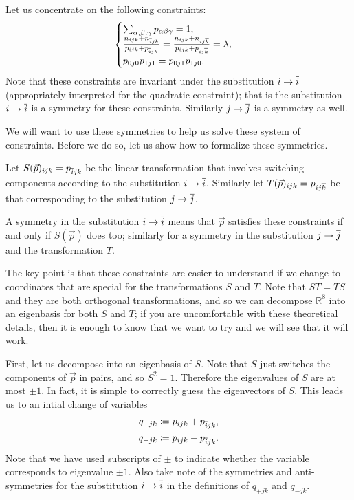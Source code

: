 Let us concentrate on the following constraints:
\begin{equation}
\begin{cases}
\sum_{\alpha, \beta, \gamma} p_{\alpha\beta\gamma} = 1, \\
\frac{n_{ijk} + n_{\overline{i}jk}} {p_{ijk} + p_{\overline{i}jk}} = 
    \frac{n_{ijk} + n_{ij\overline{k}}} {p_{ijk} + p_{ij\overline{k}}} =
    \lambda, \\
p_{0j0}p_{1j1} = p_{0j1}p_{1j0}.
\end{cases}
\end{equation}
Note that these constraints are invariant under the substitution \(i \to \overline{i}\) (appropriately interpreted
for the quadratic constraint); that is the substitution \(i \to \overline{i}\) is a symmetry for these constraints. 
Similarly \(j \to \overline{j}\) is a symmetry as well.

We will want to use these symmetries to help us solve these system of constraints. Before we do so, let us
show how to formalize these symmetries.

Let \(S(\vec p)_{ijk} = p_{\overline{i}jk}\) be the linear transformation that involves switching components
according to the substitution \(i \to \overline{i}\). Similarly let \(T(\vec p)_{ijk} = p_{ij\overline{k}}\) be that
corresponding to the substitution \(j \to \overline{j}\). 

A symmetry in the substitution \(i \to \overline{i}\) means that \(\vec p\) satisfies these constraints 
if and only if \(S (\vec p)\) does too; similarly for a symmetry in the substitution \(j \to \overline{j}\) and the
transformation \(T\).

The key point is that these constraints are easier to understand if we change to coordinates that are special
for the transformations \(S\) and \(T\). Note that \(ST = TS\) and they are both orthogonal transformations, 
and so we can decompose \(\mathbb R^8\) into an eigenbasis for both \(S\) and \(T\); if you are uncomfortable with
these theoretical details, then it is enough to know that we want to try and we will see that it will work. 

First, let us decompose into an eigenbasis of \(S\). Note that \(S\) just switches the components of \(\vec p\)
in pairs, and so \(S^2 = 1\). Therefore the eigenvalues of \(S\) are at most \(\pm 1\). In fact, it is 
simple to correctly guess the eigenvectors of \(S\). This leads us to an intial change of variables
\begin{align}
q_{+jk} & \coloneqq p_{ijk} + p_{\overline{i}jk}, \\
q_{-jk} & \coloneqq p_{ijk} - p_{\overline{i}jk}.
\end{align}
Note that we have used subscripts of \(\pm\) to indicate whether the variable corresponds to eigenvalue \(\pm 1\).
Also take note of the symmetries and anti-symmetries for the substitution \(i \to \overline{i}\) in the 
definitions of \(q_{+jk}\) and \(q_{-jk}\).

